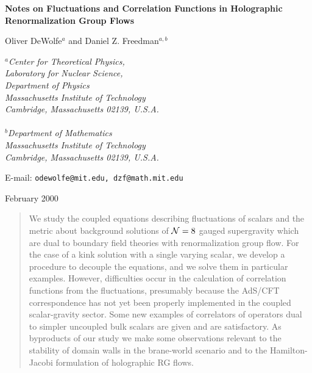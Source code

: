 \documentclass[a4paper,12pt]{article}
\begin{document}
\setlength{\baselineskip}{14pt} %
\setlength{\parskip}{1.35ex}
\setlength{\parindent}{0em}

\noindent

\thispagestyle{empty}
{}

\vspace{.3in}
\begin{center}\Large {\bf 
Notes on Fluctuations and Correlation Functions 
in Holographic Renormalization Group Flows}
\end{center}


\vspace{.1in}
\begin{center}
{\large Oliver DeWolfe$^a$ and Daniel Z. Freedman$^{a,b}$}

\vspace{.1in}
{ {\it $^a$Center for Theoretical Physics,\\
Laboratory for Nuclear Science,\\
Department of Physics\\
Massachusetts Institute of Technology\\
Cambridge, Massachusetts 02139, U.S.A. \\ \ \\
$^b$Department of Mathematics \\
Massachusetts Institute of Technology\\
Cambridge, Massachusetts 02139, U.S.A.}}
\vspace{.2in}

E-mail: {\tt odewolfe@mit.edu, dzf@math.mit.edu}
\end{center}
\begin{center}February 2000\end{center}

\vspace{0.1in}
\begin{abstract}
We study the coupled equations describing fluctuations of scalars and
the metric about background solutions of ${\cal N}=8$ gauged
supergravity which are dual to boundary field theories with
renormalization group flow. For the case of a kink solution with a
single varying scalar, we develop a procedure to decouple the
equations, and we solve them in particular examples. However,
difficulties occur in the calculation of correlation functions from
the fluctuations, presumably because the AdS/CFT correspondence has
not yet been properly implemented in the coupled scalar-gravity
sector.  Some new examples of correlators of operators dual to simpler
uncoupled bulk scalars are given and are satisfactory. As byproducts
of our study we make some observations relevant to the stability of
domain walls in the brane-world scenario and to the Hamilton-Jacobi
formulation of holographic RG flows.
\end{abstract}
\end{document}
